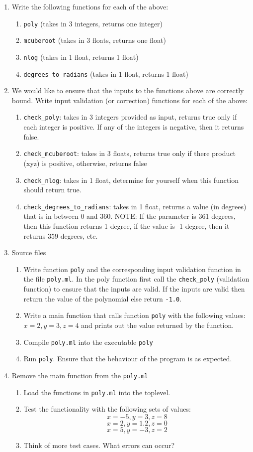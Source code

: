 \documentclass{article}
\begin{document}
\begin{enumerate}
\item Write the following functions for each of the above:
	\begin{enumerate}
		\item {\tt poly} (takes in 3 integers, returns one integer)
		\item {\tt mcuberoot} (takes in 3 floats, returns one float)
		\item {\tt nlog} (takes in 1 float, returns 1 float)
		\item {\tt degrees\_to\_radians} (takes in 1 float, returns 1 float)
	\end{enumerate}
\item We would like to ensure that the inputs to the functions above are correctly bound. Write input validation (or correction) functions for each of the above:
	\begin{enumerate}
		\item {\tt check\_poly}: takes in 3 integers provided as input, returns true only if each integer is positive. If any of the integers is negative, then it returns false.
		\item {\tt check\_mcuberoot}: takes in 3 floats, returns true only if there product (xyz) is positive, otherwise, returns false
		\item {\tt check\_nlog}: takes in 1 float, determine for yourself when this function should return true.
		\item {\tt check\_degrees\_to\_radians}: takes in 1 float, returns a value (in degrees) that is in between 0 and 360. NOTE: If the parameter is 361 degrees, then this function returns 1 degree, if the value is -1 degree, then it returns 359 degrees, etc.
	\end{enumerate}
\item Source files
	\begin{enumerate}
		\item Write function {\tt poly} and the corresponding input validation function in the file {\tt poly.ml}. In the poly function first call the {\tt check\_poly} (validation function) to ensure that the inputs are valid. If the inputs are valid then return the value of the polynomial else return {\tt-1.0}.
		\item Write a main function that calls function {\tt poly} with the following values: $x = 2, y = 3, z = 4$ and prints out the value returned by the function.
		\item Compile {\tt poly.ml} into the executable {\tt poly}
		\item Run {\tt poly}. Ensure that the behaviour of the program is as expected.
	\end{enumerate}
\item Remove the main function from the {\tt poly.ml}
	\begin{enumerate}
		\item Load the functions in {\tt poly.ml} into the toplevel.
		\item Test the functionality with the following sets of values:
			$$x = -5, y = 3, z = 8$$
			$$x = 2, y = 1.2, z = 0$$
			$$x = 5, y = -3, z = 2$$
		\item Think of more test cases. What errors can occur?
	\end{enumerate}


\end{enumerate}
\end{document}
